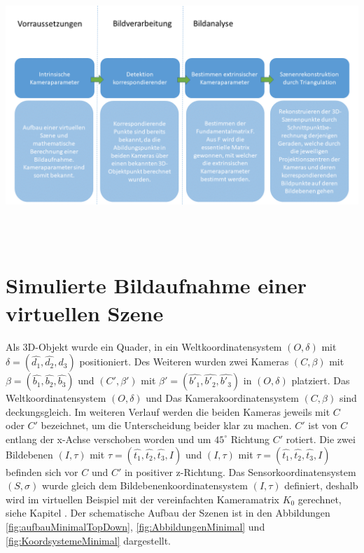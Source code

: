 \begin{minipage}{\linewidth}
	\centering
	\includegraphics[width=1.\linewidth]{images/NEU_Virtuel_Arbeitsprozess.png}
	\label{fig:ArbeitsProzessVirtuell}
\end{minipage}\\ \\

%



\section{Simulierte Bildaufnahme einer virtuellen Szene}

Als 3D-Objekt wurde ein Quader, in ein Weltkoordinatensystem $(O,\delta)$ mit $\delta = (\hat{d_1},\hat{d_2},\hat{d_3})$ positioniert. Des Weiteren wurden zwei Kameras $(C,\beta)$ mit $\beta = (\hat{b_1},\hat{b_2},\hat{b_3})$ und $(C',\beta')$ mit $\beta' = (\hat{b'_1},\hat{b'_2},\hat{b'_3})$ in $(O,\delta)$ platziert. Das Weltkoordinatensystem $(O,\delta)$ und Das Kamerakoordinatensystem $(C,\beta)$ sind deckungsgleich. Im weiteren Verlauf werden die beiden Kameras jeweils mit $C$ oder $C'$ bezeichnet, um die Unterscheidung beider klar zu machen. $C'$ ist von $C$ entlang der x-Achse verschoben worden und um $45^\circ$ Richtung $C'$ rotiert. Die zwei Bildebenen $(I,\tau)$ mit $\tau = (\hat{t_1},\hat{t_2},\hat{t_3},I)$ und $(I,\tau)$ mit $\tau = (\hat{t_1},\hat{t_2},\hat{t_3},I)$ befinden sich vor $C$ und $C'$ in positiver z-Richtung. Das Sensorkoordinatensystem $(S,\sigma)$ wurde gleich dem Bildebenenkoordinatensystem $(I,\tau)$ definiert, deshalb wird im virtuellen Beispiel mit der vereinfachten Kameramatrix $K_0$ gerechnet, siehe Kapitel .
Der schematische Aufbau der Szenen ist in den Abbildungen \ref{fig:aufbauMinimalTopDown}, \ref{fig:AbbildungenMinimal} und \ref{fig:KoordsystemeMinimal} dargestellt.


